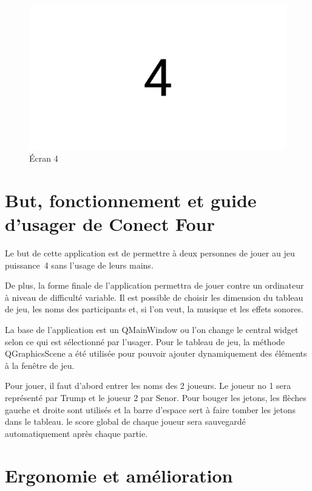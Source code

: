 \begin{figure}[H]
    \centering
    \includegraphics[width=6in]{img/4}
    \caption{Écran 4}
\end{figure}

\section{But, fonctionnement et guide d'usager de Conect Four}

Le but de cette application est de permettre à deux personnes de jouer au jeu puissance~4 sans l’usage de leurs mains.

De plus, la forme finale de l’application permettra de jouer contre un ordinateur à niveau de difficulté variable.
Il est possible de choisir les dimension du tableau de jeu, les noms des participants et, si l’on veut, la musique et les effets sonores.

La base de l’application est un QMainWindow ou l’on change le central widget selon ce qui est sélectionné par l’usager.
Pour le tableau de jeu, la méthode QGraphicsScene a été utilisée pour pouvoir ajouter dynamiquement des éléments à la fenêtre de jeu.

Pour jouer, il faut d'abord entrer les noms des 2 joueurs.
Le joueur no 1 sera représenté par Trump et le joueur 2 par Senor.
Pour bouger les jetons, les flèches gauche et droite sont utilisés et la barre d’espace sert à faire tomber les jetons dans le tableau.
le score global de chaque joueur sera sauvegardé automatiquement après chaque partie.

\section{Ergonomie et amélioration}

